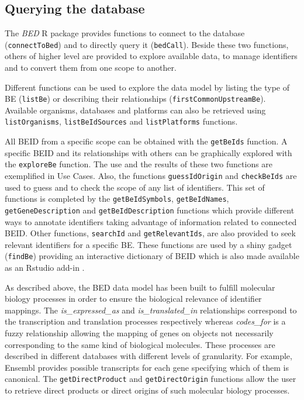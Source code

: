 \documentclass[9pt,a4paper,]{extarticle}
\theoremstyle{definition}
\theoremstyle{definition}
\theoremstyle{definition}
\theoremstyle{remark}
\begin{document}
\subsection{Querying the database}\label{querying-the-database}

The \emph{BED} R package provides functions
to connect to the \neo{} database (\texttt{connectToBed})
and to directly query it (\texttt{bedCall}).
Beside these two functions, others of higher level are provided
to explore available data, to manage identifiers
and to convert them from one scope to another.

Different functions can be used to explore the data model
by listing the type of BE (\texttt{listBe})
or describing their relationships (\texttt{firstCommonUpstreamBe}).
Available organisms, databases and platforms can also be retrieved using
\texttt{listOrganisms}, \texttt{listBeIdSources} and \texttt{listPlatforms} functions.

All BEID from a specific scope can be obtained with the \texttt{getBeIds} function.
A specific BEID and its relationships with others can be graphically explored
with the \texttt{exploreBe} function.
The use and the results of these two functions are exemplified in Use Cases.
Also, the functions \texttt{guessIdOrigin} and \texttt{checkBeIds} are used to guess and to
check the scope of any list of identifiers.
This set of functions is completed by the \texttt{getBeIdSymbols}, \texttt{getBeIdNames},
\texttt{getGeneDescription} and \texttt{getBeIdDescription} functions
which provide different ways to annotate
identifiers taking advantage of information related to connected BEID.
Other functions, \texttt{searchId} and \texttt{getRelevantIds}, are also provided
to seek relevant identifiers for a specific
BE. These functions are used by a shiny \citep{chang_shiny:_2017}
gadget (\texttt{findBe}) providing an interactive dictionary of BEID which is also made
available as an Rstudio add-in \citep{cheng_miniui:_2016, allaire_rstudioapi:_2017}.

As described above, the BED data model has been built to fulfill
molecular biology processes
in order to ensure the biological relevance of identifier mappings.
The \emph{is\_expressed\_as} and \emph{is\_translated\_in} relationships correspond
to the transcription and translation processes respectively
whereas \emph{codes\_for} is a fuzzy relationship allowing the mapping
of genes on objects
not necessarily corresponding to the same kind of biological molecules.
These processes are described in different databases with different
levels of granularity. For example, Ensembl \citep{zerbino_ensembl_2017} provides
possible transcripts for each gene specifying which of them is canonical.
The \texttt{getDirectProduct} and \texttt{getDirectOrigin} functions allow the user
to retrieve direct products or direct origins
of such molecular biology processes.
\end{document}
